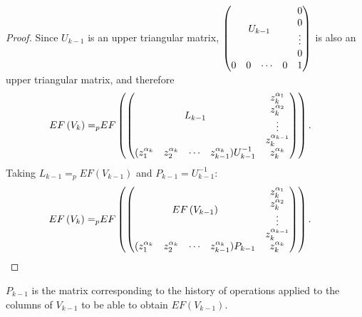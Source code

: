 \documentclass[11pt]{llncs}
\begin{document}
\begin{proof}
    
    Since $U_{k-1}$ is an upper triangular matrix, $ \begin{pmatrix}
            \multicolumn{4}{c}{\multirow{4}{*}{$U_{k-1}$}} & 0\\
            & & & & 0\\
            & & & & \vdots\\
            & & & & 0\\
            0 & 0& \cdots & 0 & 1
        \end{pmatrix}$ is also an upper triangular matrix, and therefore
      \begin{align*}
        EF\left(V_{k}\right) =_p & EF
        \begin{pmatrix}
        \begin{pmatrix}
            \multicolumn{4}{c}{\multirow{4}{*}{$L_{k-1}$}} & z_k^{\alpha_1}\\
            & & & & z_k^{\alpha_2}\\
            & & & & \vdots\\
            & & & & z_{k}^{\alpha_{k-1}}\\
            (z_1^{\alpha_{k}} & z_2^{\alpha_{k}}& \cdots & z_{k-1}^{\alpha_{k}})U_{k-1}^{-1} & z_{k}^{\alpha_k}
        \end{pmatrix}
        \end{pmatrix}.
    \end{align*}
    Taking $L_{k-1} =_p EF\left(V_{k-1}\right)$ and $P_{k-1} = U_{k-1}^{-1}$:
    \begin{align*}
        EF\left(V_{k}\right) =_p & EF
        \begin{pmatrix}
        \begin{pmatrix}
            \multicolumn{4}{c}{\multirow{4}{*}{$EF\left(V_{k-1}\right)$}} & z_k^{\alpha_1}\\
            & & & & z_k^{\alpha_2}\\
            & & & & \vdots\\
            & & & & z_{k}^{\alpha_{k-1}}\\
            (z_1^{\alpha_{k}} & z_2^{\alpha_{k}}& \cdots & z_{k-1}^{\alpha_{k}})P_{k-1} & z_{k}^{\alpha_k}
        \end{pmatrix}
        \end{pmatrix}.
    \end{align*}
\end{proof}

\begin{remark}\label{rem:historyOfOperations}
    $P_{k-1}$ is the matrix corresponding to the history of operations applied to the columns of $V_{k-1}$ to be able to obtain $EF\left(V_{k-1}\right)$.
\end{remark}
\end{document}
